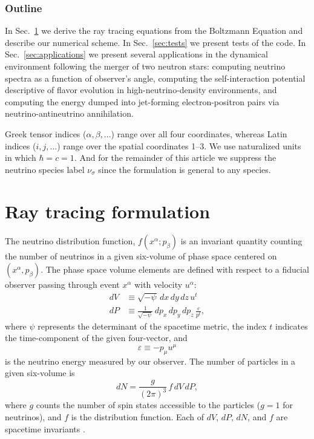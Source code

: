 \documentclass[aps,floatfix,prd,superscriptaddress,twocolumn]{revtex4-1}
\begin{document}
\subsubsection*{Outline}
In Sec.~\ref{sec:formulation} we derive the ray tracing equations from the
Boltzmann Equation and describe our numerical scheme.
In Sec.~\ref{sec:tests} we present tests of the code.
In Sec.~\ref{sec:applications} we present several applications
in the dynamical environment following the merger of two neutron stars:
computing neutrino spectra as a function of observer's angle,
computing the self-interaction potential descriptive of flavor evolution
in high-neutrino-density environments,
and computing the energy dumped into jet-forming electron-positron
pairs via neutrino-antineutrino annihilation.

Greek tensor indices ($\alpha, \beta, ...$) range over all four coordinates,
whereas Latin indices ($i, j, ...$) range over the spatial coordinates 1--3.
We use naturalized units in which $\hbar=c=1$.
And for the remainder of this article we suppress the neutrino species label
$\nu_\sigma$ since the formulation is general to any species.

\section{Ray tracing formulation}
\label{sec:formulation}
The neutrino distribution function, $f(x^\alpha; p_\beta)$ is an invariant
quantity counting the number of neutrinos in a given six-volume of phase
space centered on $(x^\alpha,p_\beta)$.
The phase space volume elements are defined with respect to a fiducial
observer passing through event $x^\alpha$ with velocity $u^\alpha$:
\begin{align}
  \label{eqn:dV}
  dV & \equiv \sqrt{-\psi} \, dx \, dy \, dz \, u^t \\
  \label{eqn:dP}
  dP & \equiv \frac{1}{\sqrt{-\psi}} \, dp_x \, dp_y \, dp_z \,
  \frac{\varepsilon}{p^t},
\end{align}
where $\psi$ represents the determinant of the spacetime metric,
the index $t$ indicates the time-component of the given four-vector, and
\begin{equation}
  \label{eqn:varepsilon}
  \varepsilon \equiv -p_\mu u^\mu
\end{equation}
is the neutrino energy measured by our observer.
The number of particles in a given six-volume is
\begin{equation}
  dN=\frac{g}{(2\pi)^3}\,f\,dV\,dP,
\end{equation}
where $g$ counts the number of spin states accessible to the
particles ($g=1$ for neutrinos), and $f$ is the distribution function.
Each of $dV$, $dP$, $dN$, and $f$ are spacetime invariants
\citep{debb2009-gr_boltzmann_1, debb2009-gr_boltzmann_2, lind1966-gr_boltzmann}.
\end{document}
